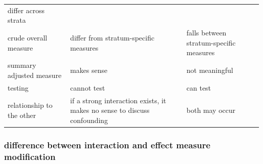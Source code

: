 \documentclass[
]{article}
\begin{document}
\begin{longtable}[]{@{}lll@{}}
\begin{minipage}[t]{0.26\columnwidth}
differ across strata\strut
\end{minipage}\tabularnewline
\begin{minipage}[t]{0.24\columnwidth}\raggedright
crude overall measure\strut
\end{minipage} & \begin{minipage}[t]{0.42\columnwidth}\raggedright
differ from stratum-specific measures\strut
\end{minipage} & \begin{minipage}[t]{0.26\columnwidth}\raggedright
falls between stratum-specific measures\strut
\end{minipage}\tabularnewline
\begin{minipage}[t]{0.24\columnwidth}\raggedright
summary adjusted measure\strut
\end{minipage} & \begin{minipage}[t]{0.42\columnwidth}\raggedright
makes sense\strut
\end{minipage} & \begin{minipage}[t]{0.26\columnwidth}\raggedright
not meaningful\strut
\end{minipage}\tabularnewline
\begin{minipage}[t]{0.24\columnwidth}\raggedright
testing\strut
\end{minipage} & \begin{minipage}[t]{0.42\columnwidth}\raggedright
cannot test\strut
\end{minipage} & \begin{minipage}[t]{0.26\columnwidth}\raggedright
can test\strut
\end{minipage}\tabularnewline
\begin{minipage}[t]{0.24\columnwidth}\raggedright
relationship to the other\strut
\end{minipage} & \begin{minipage}[t]{0.42\columnwidth}\raggedright
if a strong interaction exists, it makes no sense to discuss
confounding\strut
\end{minipage} & \begin{minipage}[t]{0.26\columnwidth}\raggedright
both may occur\strut
\end{minipage}\tabularnewline
\bottomrule
\end{longtable}

\hypertarget{difference-between-interaction-and-effect-measure-modification}{%
\subsubsection{difference between interaction and effect measure
modification}\label{difference-between-interaction-and-effect-measure-modification}}
\end{document}
